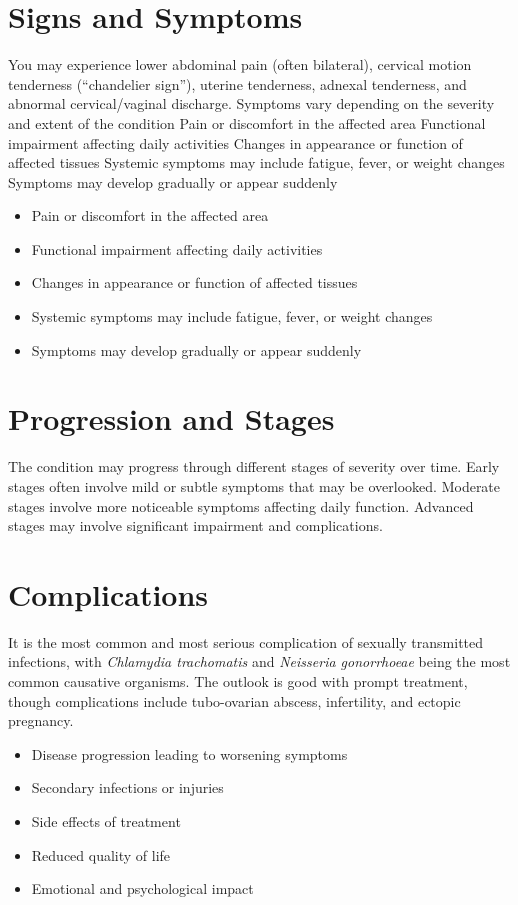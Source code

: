 \section{Signs and Symptoms}
You may experience lower abdominal pain (often bilateral), cervical motion tenderness (``chandelier sign''), uterine tenderness, adnexal tenderness, and abnormal cervical/vaginal discharge. Symptoms vary depending on the severity and extent of the condition Pain or discomfort in the affected area Functional impairment affecting daily activities Changes in appearance or function of affected tissues Systemic symptoms may include fatigue, fever, or weight changes Symptoms may develop gradually or appear suddenly

\begin{itemize}[noitemsep]
  \item Pain or discomfort in the affected area
  \item Functional impairment affecting daily activities
  \item Changes in appearance or function of affected tissues
  \item Systemic symptoms may include fatigue, fever, or weight changes
  \item Symptoms may develop gradually or appear suddenly
\end{itemize}
\section{Progression and Stages}
The condition may progress through different stages of severity over time. Early stages often involve mild or subtle symptoms that may be overlooked. Moderate stages involve more noticeable symptoms affecting daily function. Advanced stages may involve significant impairment and complications.
\section{Complications}
It is the most common and most serious complication of sexually transmitted infections, with \textit{Chlamydia trachomatis} and \textit{Neisseria gonorrhoeae} being the most common causative organisms. The outlook is good with prompt treatment, though complications include tubo-ovarian abscess, infertility, and ectopic pregnancy.

\begin{itemize}[noitemsep]
  \item Disease progression leading to worsening symptoms
  \item Secondary infections or injuries
  \item Side effects of treatment
  \item Reduced quality of life
  \item Emotional and psychological impact
\end{itemize}
